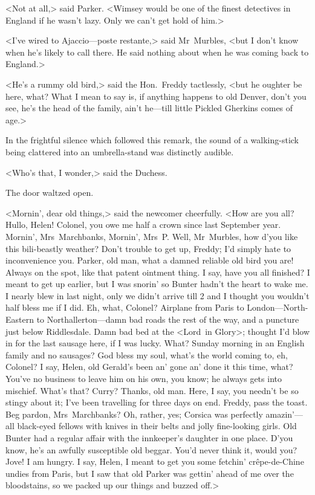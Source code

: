<Not at all,> said Parker. <Wimsey would be one of the finest detectives in England if he wasn't lazy. Only we can't get hold of him.>

<I've wired to Ajaccio—poste restante,> said Mr~Murbles, <but I don't know when he's likely to call there. He said nothing about when he was coming back to England.>

<He's a rummy old bird,> said the Hon.~Freddy tactlessly, <but he oughter be here, what? What I mean to say is, if anything happens to old Denver, don't you see, he's the head of the family, ain't he—till little Pickled Gherkins comes of age.>

In the frightful silence which followed this remark, the sound of a walking-stick being clattered into an umbrella-stand was distinctly
audible.

<Who's that, I wonder,> said the Duchess.

The door waltzed open.

<Mornin', dear old things,> said the newcomer cheerfully. <How are you all? Hullo, Helen! Colonel, you owe me half a crown since last September year. Mornin', Mrs~Marchbanks, Mornin', Mrs~P\@. Well, Mr~Murbles, how d'you like this bili-beastly weather? Don't trouble to get up, Freddy; I'd simply hate to inconvenience you. Parker, old man, what a damned reliable old bird you are! Always on the spot, like that patent ointment thing. I say, have you all finished? I meant to get up earlier, but I was snorin' so Bunter hadn't the heart to wake me. I nearly blew in last night, only we didn't arrive till 2  and I thought you wouldn't half bless me if I did. Eh, what, Colonel? Airplane  from Paris to London—North-Eastern to Northallerton—damn bad roads the rest of the way, and a puncture just below Riddlesdale. Damn bad bed at the <Lord~in Glory>; thought I'd blow in for the last sausage here, if I was lucky. What? Sunday morning in an English family and no sausages? God bless my soul, what's the world coming to, eh, Colonel? I say, Helen, old Gerald's been an' gone an' done it this time, what? You've no business to leave him on his own, you know; he always gets into mischief. What's that? Curry? Thanks, old man. Here, I say, you needn't be so stingy about it; I've been travelling for three days on end. Freddy, pass the toast. Beg pardon, Mrs~Marchbanks? Oh, rather, yes; Corsica was perfectly amazin'—all black-eyed fellows with knives in their belts and jolly fine-looking girls. Old Bunter had a regular affair with the innkeeper's daughter in one place. D'you know, he's an awfully susceptible old beggar. You'd never think it, would you? Jove! I am hungry. I say, Helen, I meant to get you some fetchin' crêpe-de-Chine undies from Paris, but I saw that old Parker was gettin' ahead of me over the bloodstains, so we packed up our things and buzzed off.>

